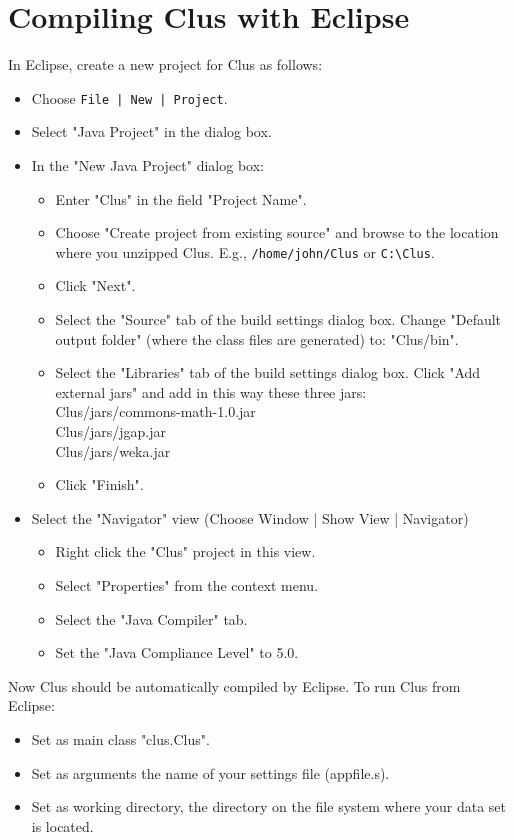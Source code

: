 \documentclass[a4paper]{report}
\begin{document}
\section{Compiling Clus with Eclipse}

In Eclipse, create a new project for Clus as follows:

\begin{itemize}
\item Choose \verb^File | New | Project^.
\item Select "Java Project" in the dialog box.
\item In the "New Java Project" dialog box:
 \begin{itemize}
 \item Enter "Clus" in the field "Project Name".
 \item Choose "Create project from existing source" and browse to the location where 
      you unzipped Clus. E.g., \verb^/home/john/Clus^ or \verb^C:\Clus^.
 \item Click "Next".
 \item Select the "Source" tab of the build settings dialog box.
     Change "Default output folder" (where the class files are generated) to: "Clus/bin".
 \item Select the "Libraries" tab of the build settings dialog box.
     Click "Add external jars" and add in this way these three jars:\\
        Clus/jars/commons-math-1.0.jar\\
        Clus/jars/jgap.jar\\
        Clus/jars/weka.jar
 \item Click "Finish".
 \end{itemize}
\item Select the "Navigator" view (Choose Window | Show View | Navigator)
 \begin{itemize}
   \item  Right click the "Clus" project in this view.
   \item  Select "Properties" from the context menu.
   \item  Select the "Java Compiler" tab.
   \item  Set the "Java Compliance Level" to 5.0.
 \end{itemize}
\end{itemize}
Now Clus should be automatically compiled by Eclipse.
To run Clus from Eclipse:
 \begin{itemize}
   \item Set as main class "clus.Clus".
   \item Set as arguments the name of your settings file (appfile.s).
   \item Set as working directory, the directory on the file system where your data set is located.
\end{itemize}
\end{document}
